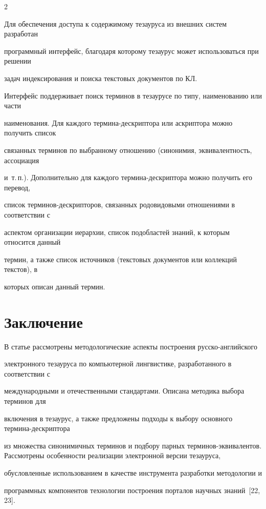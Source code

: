 \begin{multicols}{2}
   

  Для обеспечения доступа к содержимому тезауруса из внешних систем разработан 

программный интерфейс, благодаря которому тезаурус может использоваться при решении 

задач индексирования и поиска текстовых документов по КЛ.

  

  Интерфейс поддерживает поиск терминов в тезаурусе по типу, наименованию или части 

наименования. Для каждого термина-дескриптора или аскриптора можно получить список 

связанных терминов по выбранному отношению (синонимия, эквивалентность, ассоциация 

и~т.\,п.). Дополнительно для каждого термина-дескриптора можно получить его перевод, 

список терминов-дескрипторов, связанных родовидовыми отношениями в соответствии с 

аспектом организации иерархии, список подобластей знаний, к которым относится данный 

термин, а также список источников (текстовых документов или коллекций текстов), в 

которых описан данный термин.



\section{Заключение}



  В статье рассмотрены методологические аспекты построения русско-английского 

электронного тезауруса по компьютерной лингвистике, разработанного в соответствии с 

международными и отечественными стандартами. Описана методика выбора терминов для 

включения в тезаурус, а также предложены подходы к выбору основного тер\-ми\-на-де\-скрип\-то\-ра 

из множества синонимичных терминов и подбору парных терминов-эквивалентов. Рассмотрены особенности реализации электронной версии тезауруса, 

обусловленные использованием в качестве инструмента разработки методологии и 

программных компонентов технологии построения порталов научных знаний~[22, 23].


\end{multicols}

